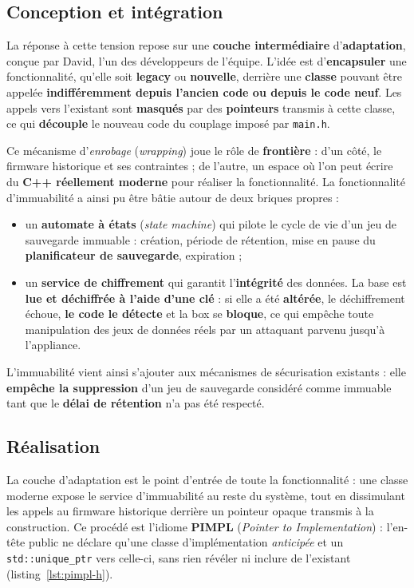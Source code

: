 \subsection{Conception et intégration}
La réponse à cette tension repose sur une \textbf{couche intermédiaire}
d'\textbf{adaptation}, conçue par David, l'un des développeurs de l'équipe.
L'idée est d'\textbf{encapsuler} une fonctionnalité, qu'elle soit
\textbf{legacy} ou \textbf{nouvelle}, derrière une \textbf{classe} pouvant être
appelée \textbf{indifféremment depuis l'ancien code ou depuis le code neuf}. Les
appels vers l'existant sont \textbf{masqués} par des \textbf{pointeurs} transmis
à cette classe, ce qui \textbf{découple} le nouveau code du couplage imposé par
\texttt{main.h}.

Ce mécanisme d'\emph{enrobage} (\emph{wrapping}) joue le rôle de
\textbf{frontière} : d'un côté, le firmware historique et ses contraintes ; de
l'autre, un espace où l'on peut écrire du \textbf{C++ réellement moderne} pour
réaliser la fonctionnalité. La fonctionnalité d'immuabilité a ainsi pu être
bâtie autour de deux briques propres :
\begin{itemize}
  \item un \textbf{automate à états} (\emph{state machine}) qui pilote le cycle
        de vie d'un jeu de sauvegarde immuable : création, période de rétention,
        mise en pause du \textbf{planificateur de sauvegarde}, expiration ;
  \item un \textbf{service de chiffrement} qui garantit l'\textbf{intégrité} des
        données. La base est \textbf{lue et déchiffrée à l'aide d'une clé} : si
        elle a été \textbf{altérée}, le déchiffrement échoue, \textbf{le code le
        détecte} et la box se \textbf{bloque}, ce qui empêche toute manipulation
        des jeux de données réels par un attaquant parvenu jusqu'à l'appliance.
\end{itemize}
L'immuabilité vient ainsi s'ajouter aux mécanismes de sécurisation existants :
elle \textbf{empêche la suppression} d'un jeu de sauvegarde considéré comme
immuable tant que le \textbf{délai de rétention} n'a pas été respecté.

\subsection{Réalisation}
La couche d'adaptation est le point d'entrée de toute la fonctionnalité :
une classe moderne expose le service d'immuabilité au reste du système, tout
en dissimulant les appels au firmware historique derrière un pointeur opaque
transmis à la construction. Ce procédé est l'idiome \textbf{PIMPL}
(\emph{Pointer to Implementation}) : l'en-tête public ne déclare qu'une classe
d'implémentation \emph{anticipée} et un \texttt{std::unique\_ptr} vers
celle-ci, sans rien révéler ni inclure de l'existant
(listing~\ref{lst:pimpl-h}).

